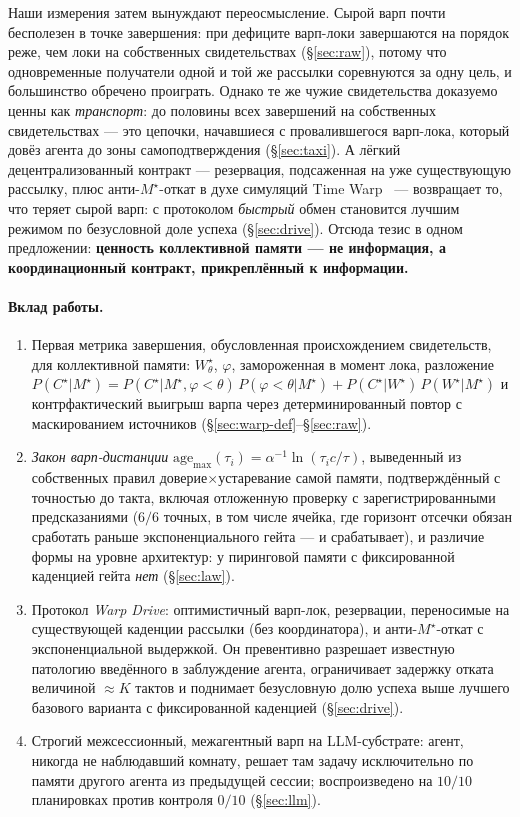 \documentclass{article}
\newcommand{\wstar}{W^{\star}}
\newcommand{\mstar}{M^{\star}}
\newcommand{\cstar}{C^{\star}}
\begin{document}
Наши измерения затем вынуждают переосмысление. Сырой варп почти
бесполезен в точке завершения: при дефиците варп-локи завершаются на
порядок реже, чем локи на собственных свидетельствах
(\S\ref{sec:raw}), потому что одновременные получатели одной и той же
рассылки соревнуются за одну цель, и большинство обречено проиграть.
Однако те же чужие свидетельства доказуемо ценны как
\emph{транспорт}: до половины всех завершений на собственных
свидетельствах --- это цепочки, начавшиеся с провалившегося
варп-лока, который довёз агента до зоны самоподтверждения
(\S\ref{sec:taxi}). А лёгкий децентрализованный контракт ---
резервация, подсаженная на уже существующую рассылку, плюс
анти-$\mstar$-откат в духе симуляций Time
Warp~\cite{jefferson1985}
--- возвращает то, что теряет сырой варп: с протоколом \emph{быстрый}
обмен становится лучшим режимом по безусловной доле успеха
(\S\ref{sec:drive}). Отсюда тезис в одном предложении:
\textbf{ценность коллективной памяти --- не информация, а
координационный контракт, прикреплённый к информации.}

\paragraph{Вклад работы.}
\begin{enumerate}[leftmargin=20pt,itemsep=2pt,topsep=2pt]
\item Первая метрика завершения, обусловленная происхождением
  свидетельств, для коллективной памяти: $\wstar_\theta$, $\varphi$,
  замороженная в момент лока, разложение
  $P(\cstar|\mstar)=P(\cstar|\mstar,\varphi{<}\theta)\,P(\varphi{<}\theta|\mstar)
  + P(\cstar|\wstar)\,P(\wstar|\mstar)$ и контрфактический выигрыш
  варпа через детерминированный повтор с маскированием источников
  (\S\ref{sec:warp-def}--\S\ref{sec:raw}).
\item \emph{Закон варп-дистанции}
  $\mathrm{age}_{\max}(\tau_i)=\alpha^{-1}\ln(\tau_i c/\tau)$,
  выведенный из собственных правил доверие$\times$устаревание самой
  памяти, подтверждённый с точностью до такта, включая отложенную
  проверку с зарегистрированными предсказаниями ($6/6$ точных, в том
  числе ячейка, где горизонт отсечки обязан сработать раньше
  экспоненциального гейта --- и срабатывает), и различие формы на
  уровне архитектур: у пиринговой памяти с фиксированной каденцией
  гейта \emph{нет} (\S\ref{sec:law}).
\item Протокол \emph{Warp Drive}: оптимистичный варп-лок, резервации,
  переносимые на существующей каденции рассылки (без координатора), и
  анти-$\mstar$-откат с экспоненциальной выдержкой. Он превентивно
  разрешает известную патологию введённого в заблуждение агента,
  ограничивает задержку отката величиной ${\approx}K$ тактов и
  поднимает безусловную долю успеха выше лучшего базового варианта с
  фиксированной каденцией (\S\ref{sec:drive}).
\item Строгий межсессионный, межагентный варп на LLM-субстрате:
  агент, никогда не наблюдавший комнату, решает там задачу
  исключительно по памяти другого агента из предыдущей сессии;
  воспроизведено на $10/10$ планировках против контроля $0/10$
  (\S\ref{sec:llm}).
\end{enumerate}
\end{document}
